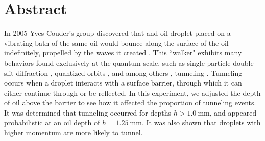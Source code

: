     \chapter*{Abstract}
	In 2005 Yves Couder's group discovered that and oil droplet placed on a vibrating bath of the same oil would bounce along the surface of the oil indefinitely, propelled by the waves it created . This ``walker" exhibits many behaviors found exclusively at the quantum scale, such as single particle double slit diffraction , quantized orbits , and among others , tunneling . Tunneling occurs when a droplet interacts with a surface barrier, through which it can either continue through or be reflected. In this experiment, we adjusted the depth of oil above the barrier to see how it affected the proportion of tunneling events. It was determined that tunneling occurred for depths $h>1.0~\mathrm{mm}$, and appeared probabilistic at an oil depth of $h=1.25~\mathrm{mm}$. It was also shown that droplets with higher momentum are more likely to tunnel. 